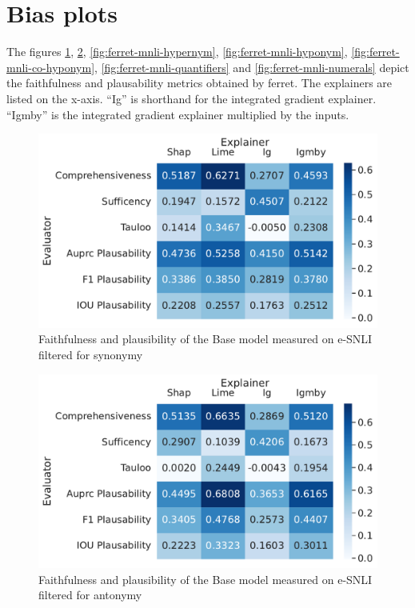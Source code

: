 \section{Bias plots} \label{sec:bias_plots}

The figures \ref{fig:ferret-mnli-synonym}, \ref{fig:ferret-mnli-antonym}, \ref{fig:ferret-mnli-hypernym}, \ref{fig:ferret-mnli-hyponym}, \ref{fig:ferret-mnli-co-hyponym}, \ref{fig:ferret-mnli-quantifiers} and \ref{fig:ferret-mnli-numerals} depict the faithfulness and plausability metrics obtained by ferret. The explainers are listed on the x-axis. \enquote{Ig} is shorthand for the integrated gradient explainer. \enquote{Igmby} is the integrated gradient explainer multiplied by the inputs.

\begin{figure}[h!]
    \centering
    \includegraphics[width=\textwidth]{./images/ferret_heatmaps_phenomena/default_mnli/synonym.pdf}
    \caption{Faithfulness and plausibility of the Base model measured on \acs{e-SNLI} filtered for synonymy}
    \label{fig:ferret-mnli-synonym}
\end{figure}

\begin{figure}[h!]
    \centering
    \includegraphics[width=\textwidth]{./images/ferret_heatmaps_phenomena/default_mnli/antonym.pdf}
    \caption{Faithfulness and plausibility of the Base model measured on \acs{e-SNLI} filtered for antonymy}
    \label{fig:ferret-mnli-antonym}
\end{figure}

